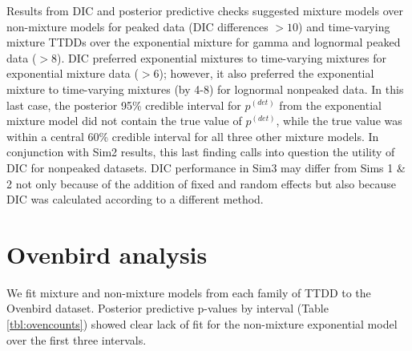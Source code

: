 \documentclass[useAMS,usenatbib,referee,12pt]{article}
\newcommand{\adam}[1]{{\color{blue} ADAM: #1}}
\begin{document}
Results from DIC and posterior predictive checks suggested mixture models over non-mixture models for peaked data (DIC differences $>10$) and time-varying mixture TTDDs over the exponential mixture for gamma and lognormal peaked data ($>8$).
DIC preferred exponential mixtures to time-varying mixtures for exponential mixture data ($>6$); however, it also preferred the exponential mixture to time-varying mixtures (by 4-8) for lognormal nonpeaked data.  
In this last case, the posterior 95\% credible interval for $p^{(det)}$ from the exponential mixture model did not contain the true value of $p^{(det)}$, while the true value was within a central 60\% credible interval for all three other mixture models.  
In conjunction with Sim2 results, this last finding calls into question the utility of DIC for nonpeaked datasets.
DIC performance in Sim3 may differ from Sims 1 \& 2 not only because of the addition of fixed and random effects but also because DIC was calculated according to a different method.








\section{Ovenbird analysis}\label{sec:ovenbirds}

We fit mixture and non-mixture models from each family of TTDD to the Ovenbird dataset.  
Posterior predictive p-values by interval (Table \ref{tbl:ovencounts}) showed clear lack of fit for the non-mixture exponential model over the first three intervals.  
\end{document}
